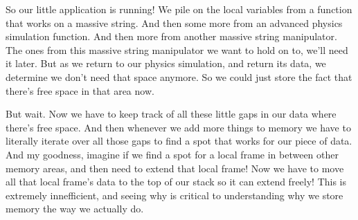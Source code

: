 \documentclass[12pt]{article}
\begin{document}
\begin{center}
\end{center}

So our little application is running! We pile on the local variables from a function that works on a massive string. And then some more from an advanced physics simulation function. And then more from another massive string manipulator. The ones from this massive string manipulator we want to hold on to, we'll need it later. But as we return to our physics simulation, and return its data, we determine we don't need that space anymore. So we could just store the fact that there's free space in that area now.

But wait. Now we have to keep track of all these little gaps in our data where there's free space. And then whenever we add more things to memory we have to literally iterate over all those gaps to find a spot that works for our piece of data. And my goodness, imagine if we find a spot for a local frame in between other memory areas, and then need to extend that local frame! Now we have to move all that local frame's data to the top of our stack so it can extend freely! This is extremely innefficient, and seeing why is critical to understanding why we store memory the way we actually do.
\end{document}
